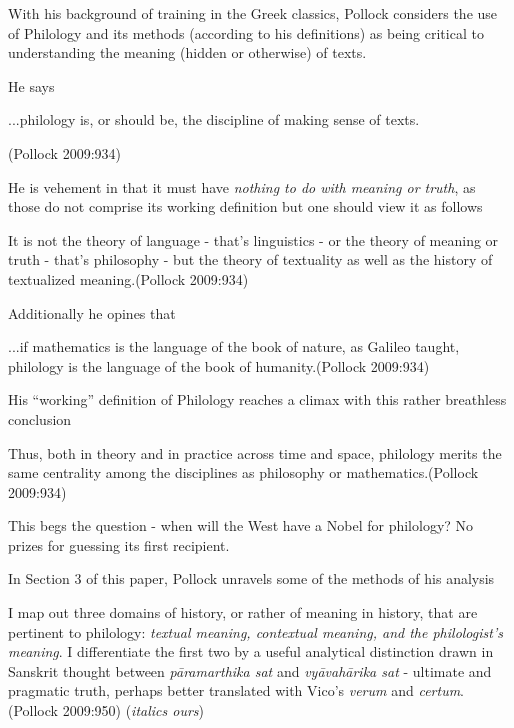 With his background of training in the Greek classics, Pollock considers the use of Philology and its methods (according to his definitions) as being critical to understanding the meaning (hidden or otherwise) of texts.

He says 
\begin{myquote}
...philology is, or should be, the discipline of making sense of texts.

\hfill (Pollock 2009:934)
\end{myquote}

He is vehement in that it must have {{\sl nothing to do with meaning or truth}\relax}, as those do not comprise its working definition but one should view it as follows
\begin{myquote}
It is not the theory of language - that's linguistics - or the theory of meaning or truth - that's philosophy - but the theory of textuality as well as the history of textualized meaning.\hfill (Pollock 2009:934)
\end{myquote}

Additionally he opines that
\begin{myquote}
...if mathematics is the language of the book of nature, as Galileo taught, philology is the language of the book of humanity.\hfill (Pollock 2009:934)
\end{myquote}

His ``working'' definition of Philology reaches a climax with this rather breathless conclusion
\begin{myquote}
Thus, both in theory and in practice across time and space, philology merits the same centrality among the disciplines as philosophy or mathematics.\hfill (Pollock 2009:934)
\end{myquote}

\newpage

This begs the question - when will the West have a Nobel for philology? No prizes for guessing its first recipient.

In Section 3 of this paper, Pollock unravels some of the methods of his analysis
\begin{myquote}
I map out three domains of history, or rather of meaning in history, that are pertinent to philology: {\sl textual meaning, contextual meaning, and the philologist's meaning}. I differentiate the first two by a useful analytical distinction drawn in Sanskrit thought between {\sl pāramarthika sat} and {\sl vyāvahārika sat} -  ultimate and pragmatic truth, perhaps better translated with Vico's {\sl verum} and {\sl certum}. 
\hfill (Pollock 2009:950) ({\sl italics ours})
\end{myquote}

